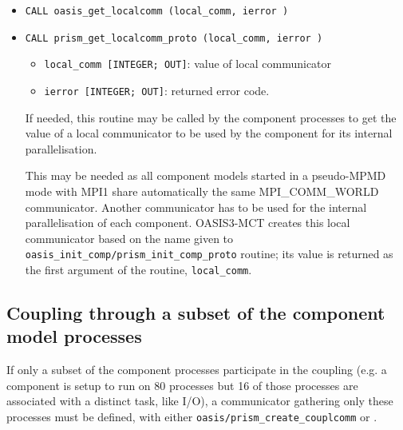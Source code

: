 \begin{itemize}
\item {\tt CALL oasis\_get\_localcomm        (local\_comm, ierror )}
\item {\tt CALL prism\_get\_localcomm\_proto (local\_comm, ierror )}

 \begin{itemize}
   \item {\tt local\_comm [INTEGER; OUT]}: value of local communicator
   \item {\tt ierror [INTEGER; OUT]}: returned error code.
 \end{itemize}

  If needed, this routine may be called by the component processes  
  to get the value of a local communicator to be used by the component
  for its internal parallelisation.

  This may be needed as all component models started in a
  pseudo-MPMD mode with MPI1 share automatically the same MPI\_COMM\_WORLD
  communicator.  Another communicator has to be used for the internal
  parallelisation of each component. OASIS3-MCT creates this local
  communicator based on the name given to {\tt oasis\_init\_comp/prism\_init\_comp\_proto} routine; its value is returned
  as the first argument of the routine, {\tt local\_comm}.

\end{itemize}

\subsection{Coupling through a subset of the component model
  processes}
\label{subsec_subset}

If only a subset of the component processes participate in the coupling (e.g. a component is setup to run on 80 processes but
16 of those processes are associated with a distinct task, like I/O), a communicator gathering only these processes must be defined, with either {\tt oasis/prism\_create\_couplcomm} or .

